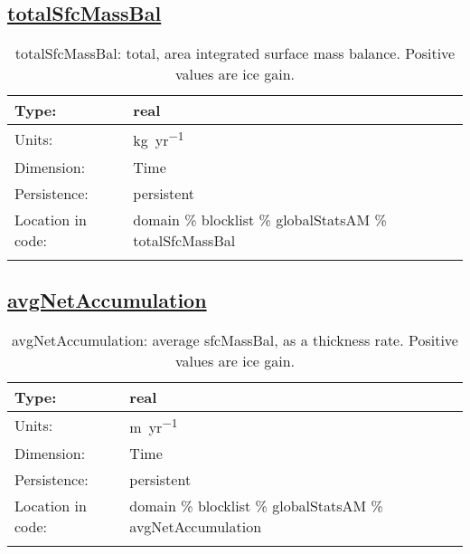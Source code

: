 \subsection[totalSfcMassBal]{\hyperref[sec:var_tab_globalStatsAM]{totalSfcMassBal}}
\label{subsec:var_sec_globalStatsAM_totalSfcMassBal}
\begin{center}
\begin{longtable}{| p{2.0in} | p{4.0in} |}
        \hline 
        Type: & real \\
        \hline 
        Units: & \si{kg.yr^{-1}} \\
        \hline 
        Dimension: & Time \\
        \hline 
        Persistence: & persistent \\
        \hline 
         Location in code: & domain \% blocklist \% globalStatsAM \% totalSfcMassBal \\
         \hline 
    \caption{totalSfcMassBal: total, area integrated surface mass balance. Positive values are ice gain.}
\end{longtable}
\end{center}
\subsection[avgNetAccumulation]{\hyperref[sec:var_tab_globalStatsAM]{avgNetAccumulation}}
\label{subsec:var_sec_globalStatsAM_avgNetAccumulation}
\begin{center}
\begin{longtable}{| p{2.0in} | p{4.0in} |}
        \hline 
        Type: & real \\
        \hline 
        Units: & \si{m.yr^{-1}} \\
        \hline 
        Dimension: & Time \\
        \hline 
        Persistence: & persistent \\
        \hline 
         Location in code: & domain \% blocklist \% globalStatsAM \% avgNetAccumulation \\
         \hline 
    \caption{avgNetAccumulation: average sfcMassBal, as a thickness rate. Positive values are ice gain.}
\end{longtable}
\end{center}
